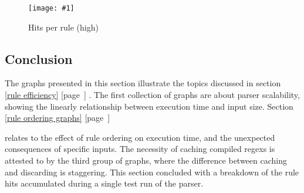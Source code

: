 \documentclass[a4paper,12pt,draft]{article}
\newcommand{\showgraph}[3]{
    \begin{figure}[hbt!]
        \caption{#2}\label{#3}
        \texttt{[image: \#1]}
    \end{figure}
}
\newcommand{\refwithpage}[1]{%
    \empty{}\ref{#1} [page~\pageref{#1}]%
}
\begin{document}
\showgraph{build/plot-hits-high.ps}{Hits per rule (high)}{hits per rule
high}

\clearpage

\subsection{Conclusion}

The graphs presented in this section illustrate the topics discussed in
section~\refwithpage{rule efficiency}.  The first collection of graphs are
about parser scalability, showing the linearly relationship between
execution time and input size.  Section~\refwithpage{rule ordering graphs}
relates to the effect of rule ordering on execution time, and the
unexpected consequences of specific inputs.  The necessity of caching
compiled regexs is attested to by the third group of graphs, where the
difference between caching and discarding is staggering.  This section
concluded with a breakdown of the rule hits accumulated during a single
test run of the parser.


\renewcommand{\glossarytitle}{\section{Glossary}\label{Glossary}}
\printglossary{}
\renewcommand{\glossarytitle}{\section{Acronyms}\label{Acronyms}}
\printacronym{}

\end{document}
